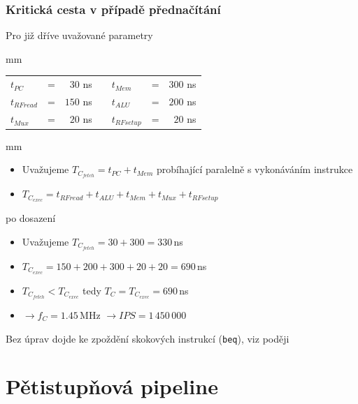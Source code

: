 \documentclass{beamer}
\begin{document}
\begin{frame}
\frametitle{Kritická cesta v případě přednačítání}

Pro již dříve uvažované parametry

 mm

\begin{tabular}{l c r m{1 cm} l c r}
$t_{PC}$ & = & $30$ ns & & $t_{Mem}$ & = & $300$ ns \\
$t_{RFread}$ & = & $150$ ns  & & $t_{ALU}$ & = & $200$ ns \\
$t_{Mux}$ & = & $20$ ns  & & $t_{RFsetup}$ & = & $20$ ns \\
\end{tabular}

 mm

\begin{itemize}
 \item Uvažujeme $T_{C_{fetch}} =  t_{PC} + t_{Mem}$ probíhající paralelně s vykonáváním instrukce
 \item $T_{C_{exec}} = t_{RFread} + t_{ALU} + t_{Mem} + t_{Mux} + t_{RFsetup}$
\end{itemize}

po dosazení

\begin{itemize}
 \item Uvažujeme $T_{C_{fetch}} =  30 + 300 = 330$\,ns
 \item $T_{C_{exec}} = 150 + 200 + 300 + 20 + 20 = 690$\,ns
 \item $T_{C_{fetch}} < T_{C_{exec}}$ tedy $T_{C} = T_{C_{exec}} = 690$\,ns
 \item $\rightarrow f_{C} = 1.45$\,MHz $\rightarrow IPS = 1\,450\,000$
\end{itemize}

Bez úprav dojde ke zpoždění skokových instrukcí (\texttt{beq}), viz poději

\end{frame}

\section{Pětistupňová pipeline}
\end{document}
